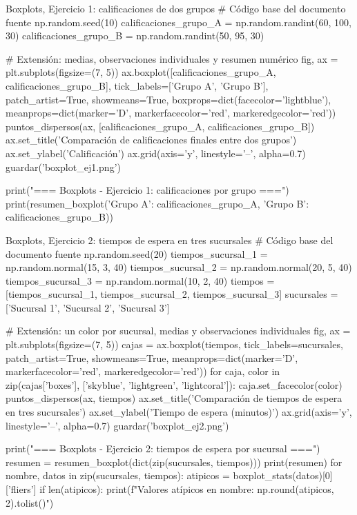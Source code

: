 \documentclass[11pt,letterpaper]{article}
\begin{document}
\begin{codigo}[label=cod:box1]{Boxplots, Ejercicio 1: calificaciones de dos grupos}
# Código base del documento fuente
np.random.seed(10)
calificaciones_grupo_A = np.random.randint(60, 100, 30)
calificaciones_grupo_B = np.random.randint(50, 95, 30)

# Extensión: medias, observaciones individuales y resumen numérico
fig, ax = plt.subplots(figsize=(7, 5))
ax.boxplot([calificaciones_grupo_A, calificaciones_grupo_B],
           tick_labels=['Grupo A', 'Grupo B'],
           patch_artist=True, showmeans=True,
           boxprops=dict(facecolor='lightblue'),
           meanprops=dict(marker='D', markerfacecolor='red', markeredgecolor='red'))
puntos_dispersos(ax, [calificaciones_grupo_A, calificaciones_grupo_B])
ax.set_title('Comparación de calificaciones finales entre dos grupos')
ax.set_ylabel('Calificación')
ax.grid(axis='y', linestyle='--', alpha=0.7)
guardar('boxplot_ej1.png')

print("=== Boxplots - Ejercicio 1: calificaciones por grupo ===")
print(resumen_boxplot({'Grupo A': calificaciones_grupo_A,
                       'Grupo B': calificaciones_grupo_B}))
\end{codigo}

\begin{codigo}[label=cod:box2]{Boxplots, Ejercicio 2: tiempos de espera en tres sucursales}
# Código base del documento fuente
np.random.seed(20)
tiempos_sucursal_1 = np.random.normal(15, 3, 40)
tiempos_sucursal_2 = np.random.normal(20, 5, 40)
tiempos_sucursal_3 = np.random.normal(10, 2, 40)
tiempos = [tiempos_sucursal_1, tiempos_sucursal_2, tiempos_sucursal_3]
sucursales = ['Sucursal 1', 'Sucursal 2', 'Sucursal 3']

# Extensión: un color por sucursal, medias y observaciones individuales
fig, ax = plt.subplots(figsize=(7, 5))
cajas = ax.boxplot(tiempos, tick_labels=sucursales, patch_artist=True, showmeans=True,
                   meanprops=dict(marker='D', markerfacecolor='red', markeredgecolor='red'))
for caja, color in zip(cajas['boxes'], ['skyblue', 'lightgreen', 'lightcoral']):
    caja.set_facecolor(color)
puntos_dispersos(ax, tiempos)
ax.set_title('Comparación de tiempos de espera en tres sucursales')
ax.set_ylabel('Tiempo de espera (minutos)')
ax.grid(axis='y', linestyle='--', alpha=0.7)
guardar('boxplot_ej2.png')

print("\n=== Boxplots - Ejercicio 2: tiempos de espera por sucursal ===")
resumen = resumen_boxplot(dict(zip(sucursales, tiempos)))
print(resumen)
for nombre, datos in zip(sucursales, tiempos):
    atipicos = boxplot_stats(datos)[0]['fliers']
    if len(atipicos):
        print(f"Valores atípicos en {nombre}: {np.round(atipicos, 2).tolist()}")
\end{codigo}
\end{document}
